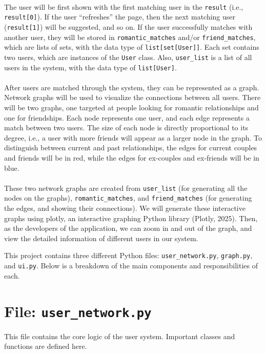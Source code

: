 \documentclass[fontsize=11pt]{article}
\begin{document}
\\
The user will be first shown with the first matching user in the \texttt{result}  (i.e., \texttt{result[0]}).
If the user “refreshes” the page, then the next matching user (\texttt{result[1]}) will be suggested, and so on.
If the user successfully matches with another user, they will be stored in \texttt{romantic\_matches} and/or \texttt{friend\_matches},
which are lists of sets, with the data type of \texttt{list[set[User]]}.
Each set contains two users, which are instances of the \texttt{User} class.
Also, \texttt{user\_list} is a list of all users in the system, with the data type of \texttt{list[User]}.
\\
\\
After users are matched through the system, they can be represented as a graph.
Network graphs will be used to visualize the connections between all users.
There will be two graphs, one targeted at people looking for romantic relationships and one for friendships.
Each node represents one user, and each edge represents a match between two users.
The size of each node is directly proportional to its degree, i.e., a user with more friends will appear as a larger node in the graph.
To distinguish between current and past relationships, the edges for current couples and friends will be in red, while the edges for ex-couples and ex-friends will be in blue.
\\
\\
These two network graphs are created from \texttt{user\_list} (for generating all the nodes on the graphs),
\texttt{romantic\_matches}, and \texttt{friend\_matches} (for generating the edges, and showing their connections).
We will generate these interactive graphs using plotly, an interactive graphing Python library (Plotly, 2025).
Then, as the developers of the application, we can zoom in and out of the graph, and view the detailed information of different users in our system.

This project contains three different Python files: \texttt{user\_network.py}, \texttt{graph.py}, and \texttt{ui.py}. Below is a breakdown of the main components and responsibilities of each.

\section*{File: \texttt{user\_network.py}}

This file contains the core logic of the user system. Important classes and functions are defined here.
\end{document}
